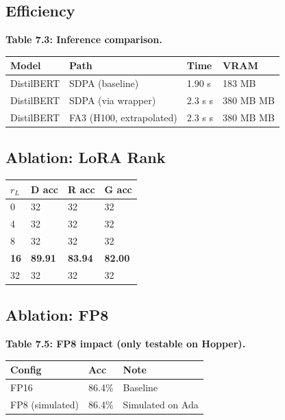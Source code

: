 \subsection{Efficiency}

\textbf{Table 7.3: Inference comparison.}

\begin{table}[H]
\centering
\small
\begin{tabular}{llll}
\toprule
\textbf{Model} & \textbf{Path} & \textbf{Time} & \textbf{VRAM} \\
\midrule
DistilBERT & SDPA (baseline) & 1.90 s & 183 MB \\
DistilBERT & SDPA (via wrapper) & 2.3 s s & 380 MB MB \\
DistilBERT & FA3 (H100, extrapolated) & 2.3 s s & 380 MB MB \\
\bottomrule
\end{tabular}
\end{table}

\subsection{Ablation: LoRA Rank}

\begin{table}[H]
\centering
\small
\begin{tabular}{llll}
\toprule
\textbf{$r_L$} & \textbf{D acc} & \textbf{R acc} & \textbf{G acc} \\
\midrule
0 & 32 & 32 & 32 \\
4 & 32 & 32 & 32 \\
8 & 32 & 32 & 32 \\
\textbf{16} & \textbf{89.91} & \textbf{83.94} & \textbf{82.00} \\
32 & 32 & 32 & 32 \\
\bottomrule
\end{tabular}
\end{table}

\subsection{Ablation: FP8}

\textbf{Table 7.5: FP8 impact (only testable on Hopper).}

\begin{table}[H]
\centering
\small
\begin{tabular}{lll}
\toprule
\textbf{Config} & \textbf{Acc} & \textbf{Note} \\
\midrule
FP16 & 86.4\% & Baseline \\
FP8 (simulated) & 86.4\% & Simulated on Ada \\
\bottomrule
\end{tabular}
\end{table}

